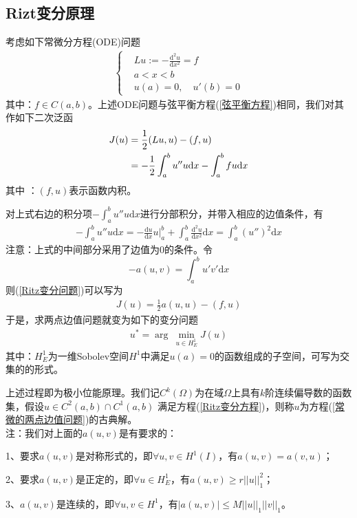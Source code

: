     \subsection{Rizt变分原理}
        \label{subsec:Rizt变分原理}
        \par
        考虑如下常微分方程(ODE)问题
        \begin{align}
            \label{常微的两点边值问题}
            \left\{
                \begin{aligned}
                &Lu:= - \frac{\mathrm{d} ^2u}{\mathrm{d} x^2} = f\\
                &a<x<b\\
                &u(a) = 0,\quad u'(b ) = 0
                \end{aligned}
            \right.
        \end{align}
        其中：$f\in C(a,b)$。上述ODE问题与弦平衡方程(\ref{弦平衡方程})相同，我们对其作如下二次泛函
        \begin{align}
            \label{Ritz变分问题}
            J(u) &= \frac 12  (Lu,u) - (f,u)\notag \\
                 & = -\frac12 \int_a^b u''u\mathrm{d}x - \int_a^b fu \mathrm{d}x
        \end{align}
        其中 ：$(f,u)$表示函数内积。
        \par
        对上式右边的积分项$-\int_a^b u''u\mathrm{d}x$进行分部积分，并带入相应的边值条件，有
        \begin{align*}
            -\int_a^b u''u\mathrm{d} x = -\frac{\mathrm{d} u}{\mathrm{d} x} u \Big|_a^b + \int_a^b \frac{\mathrm{d}^2 u}{\mathrm{d} x^2} \mathrm{d} x = \int_a^b (u'')^2 \mathrm{d} x
        \end{align*}
        注意：上式的中间部分采用了边值为0的条件。令
        \[
            -a(u,v) = \int_a^b u'v' \mathrm{d} x
        \]
        则(\ref{Ritz变分问题})可以写为
        \begin{align}
        \label{Ritz变分方程}
        J(u) = \frac{1}{2} a(u,u) - (f,u)
        \end{align}
        于是，求两点边值问题就变为如下的变分问题
        \begin{align*}
            u^* = \arg \ \min_{u\in H_E^1}J(u)
        \end{align*}
        其中：$H_E^1$为一维Sobolev空间$H^1$中满足$u(a) = 0$的函数组成的子空间，可写为交集的的形式。
        \par
        上述过程即为极小位能原理。我们记$C^k(\Omega)$为在域$\Omega$上具有$k$阶连续偏导数的函数集，假设$u\in C^2(a,b) \cap C^1(a,b)$ 满足方程(\ref{Ritz变分方程})，则称$u$为方程(\ref{常微的两点边值问题})的古典解。\\
        注\label{极小位能的要求}：我们对上面的$a(u,v)$是有要求的：\par
        1、要求$a(u,v)$是对称形式的，即$\forall u,v \in H^1(I)$，有$a(u,v) = a(v,u)$；\par
        2、要求$a(u,v)$是正定的，即$\forall u \in H_E^1$，有$a(u,v) \geqslant r||u||_1^2$；\par
        3、$a(u,v)$是连续的，即$\forall u,v\in H^1$，有$|a(u,v)| \leqslant M||u||_1||v||_1$。

